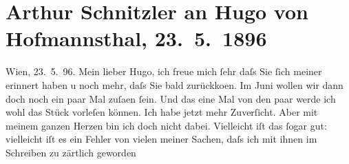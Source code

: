 

         
         \renewcommand{\erwaehntePersonen}{Personen: Richard Beer-Hofmann, Otto Brahm, Johann Wolfgang von Goethe, Friedrich Hebbel, Hugo von Hofmannsthal, Gotthold Ephraim Lessing, Felix Salten, Gustav Schwarzkopf, Hippolyte Taine}
         \renewcommand{\erwaehnteOrte}{Orte: Dänemark, Norwegen, Schweden, Tlumatsch, Wien}
         \renewcommand{\erwaehnteWerke}{Werke: ?? [Englischer Kriminalroman], Der Zerrissene, Die Frau des Weisen. Erzählung, Die Revolution, Freiwild. Schauspiel in 3 Akten, Ollapatrida des durchgetriebenen Fuchsmundi, Poesie und Leben. Aus einem Vortrage, West-östlicher Divan}
               \section[Arthur Schnitzler an Hugo von Hofmannsthal, 23. 5. 1896]{ Arthur Schnitzler an Hugo von Hofmannsthal, 23. 5. 1896}\nopagebreak{}\rehead{ }\begin{ledgroupsized}[t]{13cm}\normalsize\beginnumbering{} \toendnotes[C]{\smallbreak\pagebreak[2]} 
\toendnotes[C]{\smallbreak}\pstart
           \raggedleft{}{\pb}Wien, 23. 5. 96.\pend
           \pstart
           Mein lieber Hugo, ich freue mich ſehr daſs Sie ſich meiner erinnert
               haben u noch mehr, daſs Sie bald zurückko{\geminationm}en. Im
                  Juni wollen wir dann doch noch ein paar Mal zuſa{\geminationm}en ſein. Und das eine Mal von den paar werde ich wohl
               das Stück vorleſen können. Ich
               habe jetzt mehr Zuverſicht. Aber mit meinem ganzen Herzen bin ich doch nicht dabei.
               Vielleicht iſt das ſogar gut: vielleicht {\pb}iſt es ein
               Fehler von vielen meiner Sachen, daſs ich mit ihnen im Schreiben zu zärtlich geworden

\end{ledgroupsized}
